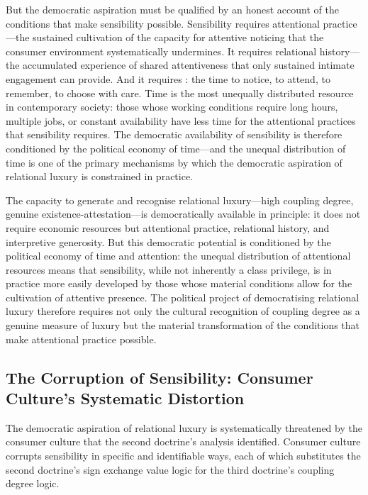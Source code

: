 But the democratic aspiration must be qualified by an honest account of the conditions that make sensibility possible. Sensibility requires attentional practice---the sustained cultivation of the capacity for attentive noticing that the consumer environment systematically undermines. It requires relational history---the accumulated experience of shared attentiveness that only sustained intimate engagement can provide. And it requires : the time to notice, to attend, to remember, to choose with care. Time is the most unequally distributed resource in contemporary society: those whose working conditions require long hours, multiple jobs, or constant availability have less time for the attentional practices that sensibility requires. The democratic availability of sensibility is therefore conditioned by the political economy of time---and the unequal distribution of time is one of the primary mechanisms by which the democratic aspiration of relational luxury is constrained in practice.

\begin{claim}
The capacity to generate and recognise relational luxury---high coupling degree, genuine existence-attestation---is democratically available in principle: it does not require economic resources but attentional practice, relational history, and interpretive generosity. But this democratic potential is conditioned by the political economy of time and attention: the unequal distribution of attentional resources means that sensibility, while not inherently a class privilege, is in practice more easily developed by those whose material conditions allow for the cultivation of attentive presence. The political project of democratising relational luxury therefore requires not only the cultural recognition of coupling degree as a genuine measure of luxury but the material transformation of the conditions that make attentional practice possible.
\end{claim}

\subsection{The Corruption of Sensibility: Consumer Culture's Systematic Distortion}
\label{p16:subsec:corruption}

\noindent
The democratic aspiration of relational luxury is systematically threatened by the consumer culture that the second doctrine's analysis identified. Consumer culture corrupts sensibility in specific and identifiable ways, each of which substitutes the second doctrine's sign exchange value logic for the third doctrine's coupling degree logic.

